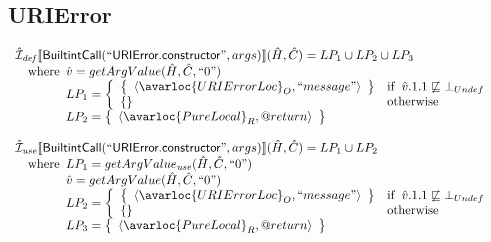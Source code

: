 \subsection{URIError}
\[
\begin{array}{l}

\aI_{\it def}\lbr \SF{BuiltintCall}(``\SF{URIError.constructor}",args)\rbr(\hat{H},\hat{C})
  = LP_1 \cup LP_2 \cup LP_3\\
\quad\wherec{
  \hat{v} = getArgValue(\hat{H}, \hat{C}, ``0")\\
  LP_1 = \left\{\begin{array}{ll}
  \set{\langle\avarloc{URIErrorLoc}_O, ``message"\rangle} & \ifc{\hat{v}.1.1 \not\sqsubseteq \bot_{Undef}}\\
  \set{} & \owc\\
    \end{array}\right.\\
  LP_2 = \set{\langle\avarloc{PureLocal}_R,\varprop{return}\rangle}\\
  }\\
\\

\aI_{\it use}\lbr \SF{BuiltintCall}(``\SF{URIError.constructor}",args)\rbr(\hat{H},\hat{C})
  = LP_1 \cup LP_2\\
\quad\wherec{
  LP_1 = getArgValue_{\it use}(\hat{H}, \hat{C}, ``0")\\
  \hat{v} = getArgValue(\hat{H}, \hat{C}, ``0")\\
  LP_2 = \left\{\begin{array}{ll}
  \set{\langle\avarloc{URIErrorLoc}_O, ``message"\rangle} & \ifc{\hat{v}.1.1 \not\sqsubseteq \bot_{Undef}}\\
  \set{} & \owc\\
    \end{array}\right.\\
  LP_3 = \set{\langle\avarloc{PureLocal}_R,\varprop{return}\rangle}\\
  }\\
\\

\end{array}
\]


